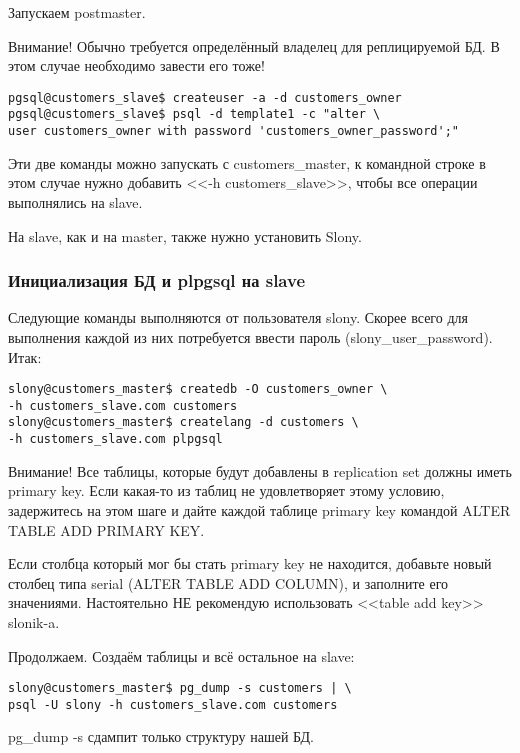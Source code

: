 Запускаем postmaster.

Внимание! Обычно требуется определённый владелец для реплицируемой БД. В этом случае необходимо завести его тоже!
\begin{lstlisting}[label=lst:slony5,caption=Подготовка одного slave-сервера]
pgsql@customers_slave$ createuser -a -d customers_owner
pgsql@customers_slave$ psql -d template1 -c "alter \
user customers_owner with password 'customers_owner_password';"
\end{lstlisting}

Эти две команды можно запускать с customers\_master, к командной строке в этом случае нужно добавить
<<-h customers\_slave>>, чтобы все операции выполнялись на slave.

На slave, как и на master, также нужно установить Slony.

\subsubsection{Инициализация БД и plpgsql на slave}

Следующие команды выполняются от пользователя slony. Скорее всего для выполнения каждой из них потребуется
ввести пароль (slony\_user\_password). Итак:
\begin{lstlisting}[label=lst:slony6,caption=Инициализация БД и plpgsql на slave]
slony@customers_master$ createdb -O customers_owner \
-h customers_slave.com customers
slony@customers_master$ createlang -d customers \
-h customers_slave.com plpgsql
\end{lstlisting}

Внимание! Все таблицы, которые будут добавлены в replication set должны иметь primary key.
Если какая-то из таблиц не удовлетворяет этому условию, задержитесь на этом шаге и дайте каждой таблице primary key
командой ALTER TABLE ADD PRIMARY KEY.

Если столбца который мог бы стать primary key не находится, добавьте новый столбец типа serial (ALTER TABLE ADD COLUMN),
и заполните его значениями. Настоятельно НЕ рекомендую использовать <<table add key>> slonik-a.

Продолжаем.
Создаём таблицы и всё остальное на slave:
\begin{lstlisting}[label=lst:slony7,caption=Инициализация БД и plpgsql на slave]
slony@customers_master$ pg_dump -s customers | \
psql -U slony -h customers_slave.com customers
\end{lstlisting}

pg\_dump -s сдампит только структуру нашей БД.

